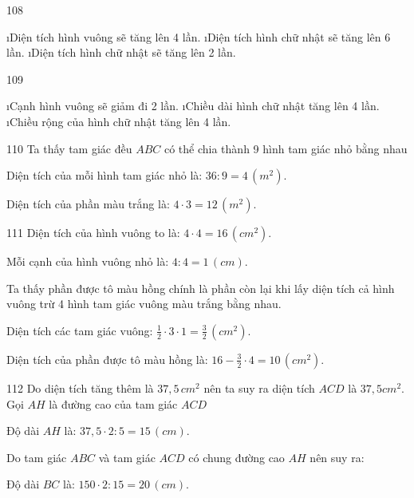 \begin{Answer}{108}
		\begin{enumerate}[a), leftmargin=*]
			\i Diện tích hình vuông sẽ tăng lên 4 lần.
			\i Diện tích hình chữ nhật sẽ tăng lên 6 lần.
			\i Diện tích hình chữ nhật sẽ tăng lên 2 lần.
		\end{enumerate}
	
\end{Answer}
\begin{Answer}{109}
		\begin{enumerate}[a), leftmargin=*]
			\i Cạnh hình vuông sẽ giảm đi 2 lần.
			\i Chiều dài hình chữ nhật tăng lên 4 lần.
			\i Chiều rộng của hình chữ nhật tăng lên 4 lần.
		\end{enumerate}
	
\end{Answer}
\begin{Answer}{110}
		Ta thấy tam giác đều $ABC$ có thể chia thành 9 hình tam giác nhỏ bằng nhau
		
		Diện tích của mỗi hình tam giác nhỏ là:  $36:9=4\,(m^2).$
		
		Diện tích của phần màu trắng là:  $4\cdot3=12\,(m^2).$
	
\end{Answer}
\begin{Answer}{111}
		Diện tích của hình vuông to là:  $4\cdot4=16 \,(cm^2).$
		
		Mỗi cạnh của hình vuông nhỏ là:  $4:4=1\,(cm).$
		
		Ta thấy phần được tô màu hồng chính là phần còn lại khi lấy diện tích cả hình vuông trừ 4 hình tam giác vuông màu trắng bằng nhau.
		
		Diện tích các tam giác vuông:  $\frac{1}{2}\cdot3\cdot1=\frac{3}{2}\, (cm^2).$
		
		Diện tích của phần được tô màu hồng là:  $16-\frac{3}{2}\cdot4=10\, (cm^2).$
	
\end{Answer}
\begin{Answer}{112}
		Do diện tích tăng thêm là  $37,5 \,cm^2$ nên ta suy ra diện tích $ACD$ là  $37,5 cm^2$. Gọi $AH$ là đường cao của tam giác $ACD$
		
		Độ dài $AH$ là:  $37,5\cdot2:5=15\,(cm).$
		
		Do tam giác $ABC$ và tam giác $ACD$ có chung đường cao $AH$ nên suy ra:
		
		Độ dài $BC$ là:  $150\cdot2:15=20 \,(cm).$
	
\end{Answer}

